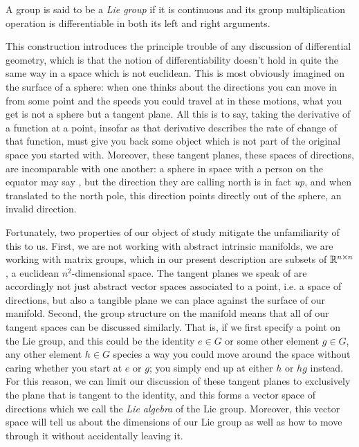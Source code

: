 \documentclass[11pt]{article}
\begin{document}
\begin{definition}
A group is said to be a \emph{Lie group} if it is continuous and its group multiplication operation is differentiable in both its left and right arguments.
\end{definition}

This construction introduces the principle trouble of any discussion of differential geometry, which is that the notion of differentiability doesn't hold in quite the same way in a space which is not euclidean. This is most obviously imagined on the surface of a sphere: when one thinks about the directions you can move in from some point and the speeds you could travel at in these motions, what you get is not a sphere but a tangent plane. All this is to say, taking the derivative of a function at a point, insofar as that derivative describes the rate of change of that function, must give you back some object which is not part of the original space you started with. Moreover, these tangent planes, these spaces of directions, are incomparable with one another: a sphere in space with a person on the equator may say , but the direction they are calling north is in fact \emph{up}, and when translated to the north pole, this direction points directly out of the sphere, an invalid direction.

Fortunately, two properties of our object of study mitigate the unfamiliarity of this to us. First, we are not working with abstract intrinsic manifolds, we are working with matrix groups, which in our present description are subsets of $\mathbb{R}^{n\times n}$, a euclidean $n^2$-dimensional space. The tangent planes we speak of are accordingly not just abstract vector spaces associated to a point, i.e. a space of directions, but also a tangible plane we can place against the surface of our manifold. Second, the group structure on the manifold means that all of our tangent spaces can be discussed similarly. That is, if we first specify a point on the Lie group, and this could be the identity $e \in G$ or some other element $g\in G$, any other element $h\in G$ species a way you could move around the space without caring whether you start at $e$ or $g$; you simply end up at either $h$ or $hg$ instead. For this reason, we can limit our discussion of these tangent planes to exclusively the plane that is tangent to the identity, and this forms a vector space of directions which we call the \emph{Lie algebra} of the Lie group. Moreover, this vector space will tell us about the dimensions of our Lie group as well as how to move through it without accidentally leaving it.
\end{document}
